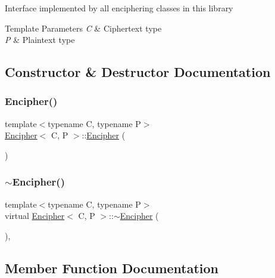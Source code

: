 Interface implemented by all enciphering classes in this library 
\begin{DoxyTemplParams}{Template Parameters}
{\em C} & Ciphertext type \\
\hline
{\em P} & Plaintext type \\
\hline
\end{DoxyTemplParams}


\subsection{Constructor \& Destructor Documentation}
\mbox{\label{classEncipher_a0d082b8ecd382929d4592e094c0028a6}} 
\subsubsection{\texorpdfstring{Encipher()}{Encipher()}}
{\footnotesize\ttfamily template$<$typename C, typename P$>$ \\
\hyperlink{classEncipher}{Encipher}$<$ C, P $>$\+::\hyperlink{classEncipher}{Encipher} (\begin{DoxyParamCaption}{ }\end{DoxyParamCaption})\hspace{0.3cm}{\ttfamily [inline]}}

\mbox{\label{classEncipher_a0960dbd85f3b203438e16d2027e557fa}} 
\subsubsection{\texorpdfstring{$\sim$\+Encipher()}{~Encipher()}}
{\footnotesize\ttfamily template$<$typename C, typename P$>$ \\
virtual \hyperlink{classEncipher}{Encipher}$<$ C, P $>$\+::$\sim$\hyperlink{classEncipher}{Encipher} (\begin{DoxyParamCaption}{ }\end{DoxyParamCaption})\hspace{0.3cm}{\ttfamily [inline]}, {\ttfamily [virtual]}}



\subsection{Member Function Documentation}
\mbox{\label{classEncipher_aaf8138eb280608bfd03c6eb762ffc010}} 
